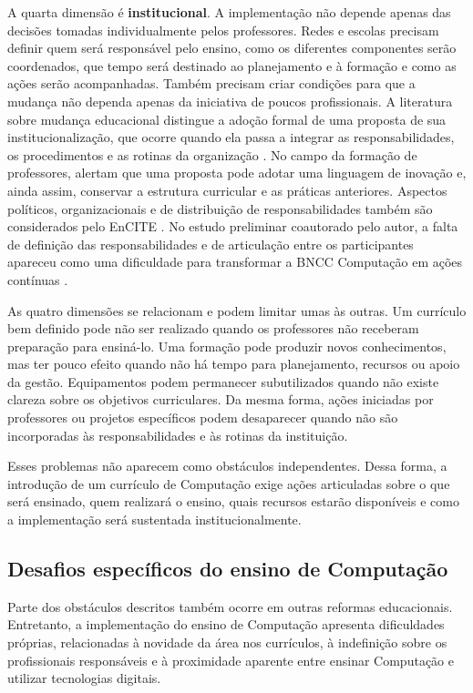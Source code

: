 A quarta dimensão é \textbf{institucional}. A implementação não depende apenas das decisões tomadas individualmente pelos professores. Redes e escolas precisam definir quem será responsável pelo ensino, como os diferentes componentes serão coordenados, que tempo será destinado ao planejamento e à formação e como as ações serão acompanhadas. Também precisam criar condições para que a mudança não dependa apenas da iniciativa de poucos profissionais. A literatura sobre mudança educacional distingue a adoção formal de uma proposta de sua institucionalização, que ocorre quando ela passa a integrar as responsabilidades, os procedimentos e as rotinas da organização \cite{fullan1991meaning}. No campo da formação de professores,  alertam que uma proposta pode adotar uma linguagem de inovação e, ainda assim, conservar a estrutura curricular e as práticas anteriores. Aspectos políticos, organizacionais e de distribuição de responsabilidades também são considerados pelo EnCITE \cite{vogel2024encite}. No estudo preliminar coautorado pelo autor, a falta de definição das responsabilidades e de articulação entre os participantes apareceu como uma dificuldade para transformar a BNCC Computação em ações contínuas \cite{santana2026desafios}.

As quatro dimensões se relacionam e podem limitar umas às outras. Um currículo bem definido pode não ser realizado quando os professores não receberam preparação para ensiná-lo. Uma formação pode produzir novos conhecimentos, mas ter pouco efeito quando não há tempo para planejamento, recursos ou apoio da gestão. Equipamentos podem permanecer subutilizados quando não existe clareza sobre os objetivos curriculares. Da mesma forma, ações iniciadas por professores ou projetos específicos podem desaparecer quando não são incorporadas às responsabilidades e às rotinas da instituição.

Esses problemas não aparecem como obstáculos independentes. Dessa forma, a introdução de um currículo de Computação exige ações articuladas sobre o que será ensinado, quem realizará o ensino, quais recursos estarão disponíveis e como a implementação será sustentada institucionalmente.

\subsection{Desafios específicos do ensino de Computação}

Parte dos obstáculos descritos também ocorre em outras reformas educacionais. Entretanto, a implementação do ensino de Computação apresenta dificuldades próprias, relacionadas à novidade da área nos currículos, à indefinição sobre os profissionais responsáveis e à proximidade aparente entre ensinar Computação e utilizar tecnologias digitais.


